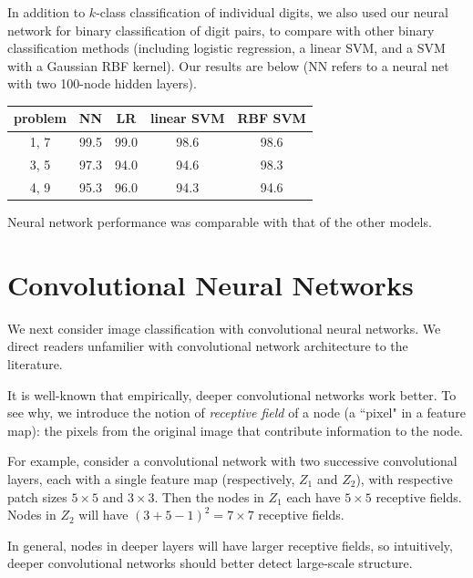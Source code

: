\documentclass{article}
\begin{document}
\begin{multicols}{2}
In addition to $k$-class classification of individual digits,
we also used our neural network for binary classification of digit pairs,
to compare with other binary classification methods
(including logistic regression, a linear SVM,
and a SVM with a Gaussian RBF kernel).
Our results are below
(NN refers to a neural net with two 100-node hidden layers).

\begin{center}
    \begin{tabular}{c|c|c|c|c}
        problem	& NN & LR & linear SVM & RBF SVM \\\hline
        1, 7 & 99.5 & 99.0 & 98.6 & 98.6 \\
        3, 5 & 97.3 & 94.0 & 94.6 & 98.3 \\
        4, 9 & 95.3 & 96.0 & 94.3 & 94.6 \\
    \end{tabular}
\end{center}
Neural network performance was comparable with that of the other models.



\section{Convolutional Neural Networks}

We next consider image classification
with convolutional neural networks.
We direct readers unfamilier with convolutional network architecture
to the literature.

It is well-known that empirically,
deeper convolutional networks work better.
To see why, we introduce the notion of \emph{receptive field}
of a node (a ``pixel" in a feature map):
the pixels from the original image that contribute information
to the node.

For example,
consider a convolutional network
with two successive convolutional layers,
each with a single feature map (respectively, $Z_1$ and $Z_2$),
with respective patch sizes $5\times 5$ and $3\times 3$.
Then the nodes in $Z_1$ each have $5\times 5$ receptive fields.
Nodes in $Z_2$ will have $(3 + 5 - 1)^2 = 7\times 7$ receptive fields.

In general,
nodes in deeper layers will have larger receptive fields,
so intuitively,
deeper convolutional networks should better detect large-scale structure.


\end{multicols}
\end{document}
